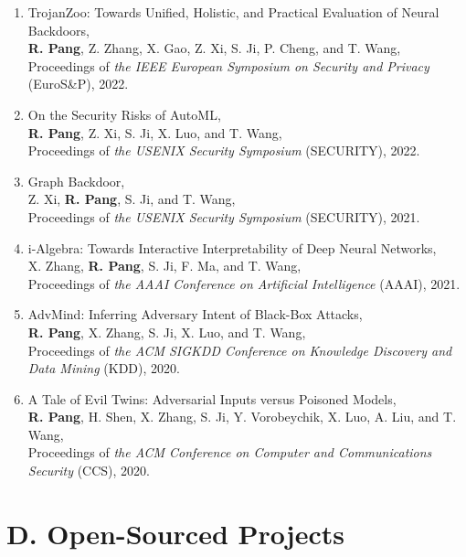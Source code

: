 \documentclass{resume}
\begin{document}
\begin{resume}
\begin{enumerate}[labelsep=15pt, parsep=8pt, resume]

\item TrojanZoo: Towards Unified, Holistic, and Practical Evaluation of Neural Backdoors,\\
\textbf{R. Pang}, Z. Zhang, X. Gao, Z. Xi, S. Ji, P. Cheng, and T. Wang,\\
Proceedings of {\it the IEEE European Symposium on Security and Privacy} (EuroS\&P), 2022.

\item On the Security Risks of AutoML,\\
\textbf{R. Pang}, Z. Xi, S. Ji, X. Luo, and T. Wang,\\
Proceedings of {\it the USENIX Security Symposium} (SECURITY), 2022.

\item Graph Backdoor,\\
Z. Xi, \textbf{R. Pang}, S. Ji, and T. Wang,\\
Proceedings of {\it the USENIX Security Symposium} (SECURITY), 2021.

\item i-Algebra: Towards Interactive Interpretability of Deep Neural Networks,\\
X. Zhang, \textbf{R. Pang}, S. Ji, F. Ma, and T. Wang,\\
Proceedings of {\it the AAAI Conference on Artificial Intelligence} (AAAI), 2021.

\item AdvMind: Inferring Adversary Intent of Black-Box Attacks,\\
\textbf{R. Pang}, X. Zhang, S. Ji, X. Luo, and T. Wang,\\
Proceedings of {\it the ACM SIGKDD Conference on Knowledge Discovery and Data Mining} (KDD), 2020.

\item A Tale of Evil Twins: Adversarial Inputs versus Poisoned Models,\\
\textbf{R. Pang}, H. Shen, X. Zhang, S. Ji, Y. Vorobeychik, X. Luo, A. Liu, and T. Wang,\\
Proceedings of {\it the ACM Conference on Computer and Communications Security} (CCS), 2020.

\end{enumerate}

\newpage

\section{D. Open-Sourced Projects}
\vspace{8pt}


\end{resume}
\end{document}
